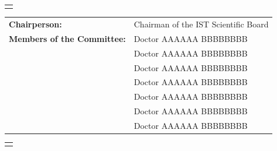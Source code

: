 {%
%
\hspace*{-10.5mm}
\begin{tabular}{p{155.5mm}}
\centering{\sffamily\large {\bf Jury}}
\end{tabular}
\hspace*{-10.5mm}
\begin{tabular}{p{58mm}p{87.5mm}}
{\sffamily\large {\bf Chairperson:}}
& {\sffamily\large Chairman of the IST Scientific Board}\smallskip\\
{\sffamily\large {\bf Members of the Committee:}}
& {\sffamily\large Doctor AAAAAA BBBBBBBB}\smallskip\\
& {\sffamily\large Doctor AAAAAA BBBBBBBB}\smallskip\\
& {\sffamily\large Doctor AAAAAA BBBBBBBB}\smallskip\\
& {\sffamily\large Doctor AAAAAA BBBBBBBB}\smallskip\\
& {\sffamily\large Doctor AAAAAA BBBBBBBB}\smallskip\\
& {\sffamily\large Doctor AAAAAA BBBBBBBB}\smallskip\\
& {\sffamily\large Doctor AAAAAA BBBBBBBB}
\end{tabular}

\vspace*{15mm}

%
%
\hspace*{-10.5mm}
\begin{tabular}{p{155.5mm}}
\centering{\sffamily\bfseries\Large 2018}
\end{tabular}

\vspace*{15mm}
}

\cleardoublepage
